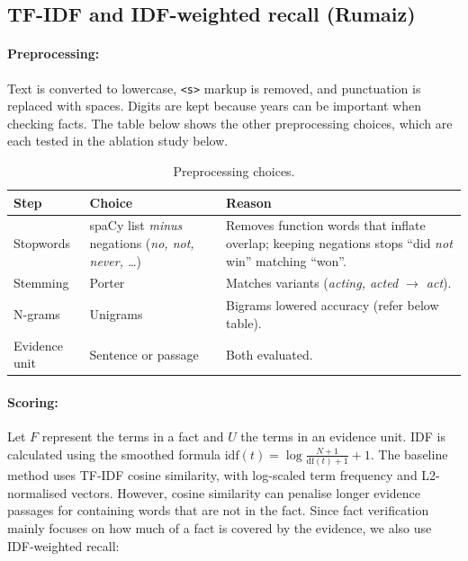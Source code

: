 \documentclass[12pt,a4paper]{article}
\begin{document}
\subsection{TF-IDF and IDF-weighted recall (Rumaiz)}
\label{sec:p1rumaiz}

\paragraph{Preprocessing:} Text is converted to lowercase, \texttt{<s>} markup is removed, and punctuation is replaced with spaces. Digits are kept because years can be important when checking facts. The table below shows the other preprocessing choices, which are each tested in the ablation study below.

\begin{table}[H]
\centering
\begin{tabularx}{\linewidth}{L{2.2cm} L{4.6cm} Y}
\toprule
Step & Choice & Reason \\
\midrule
Stopwords & spaCy list \emph{minus} negations (\textit{no, not, never, \dots}) & Removes function words that inflate overlap; keeping negations stops ``did \emph{not} win'' matching ``won''. \\
Stemming & Porter & Matches variants (\textit{acting, acted $\rightarrow$ act}). \\
N-grams & Unigrams & Bigrams lowered accuracy (refer below table). \\
Evidence unit & Sentence or passage & Both evaluated. \\
\bottomrule
\end{tabularx}
\caption{Preprocessing choices.}
\label{tab:prep}
\end{table}

\paragraph{Scoring:} Let $F$ represent the terms in a fact and $U$ the terms in an evidence unit. IDF is calculated using the smoothed formula $\mathrm{idf}(t) = \log\frac{N+1}{\mathrm{df}(t)+1} + 1$. The baseline method uses TF-IDF cosine similarity, with log-scaled term frequency and L2-normalised vectors. However, cosine similarity can penalise longer evidence passages for containing words that are not in the fact. Since fact verification mainly focuses on how much of a fact is covered by the evidence, we also use IDF-weighted recall:
\end{document}
